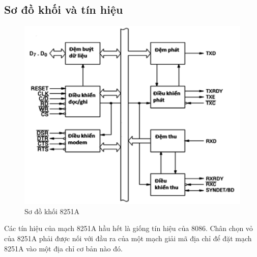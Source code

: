 \documentclass[../report.tex]{subfiles}
\begin{document}
\subsection{Sơ đồ khối và tín hiệu}
\begin{figure}[H]
    \centering
    \includegraphics[width=\textwidth]{figures/8251.png}
    \caption{Sơ đồ khối 8251A}
\end{figure}
Các tín hiệu của mạch 8251A hầu hết là giống tín hiệu của 8086. Chân chọn vỏ của
8251A phải được nối với đầu ra của một mạch giải mã địa chỉ để đặt mạch 8251A vào một
địa chỉ cơ bản nào đó.
\end{document}
